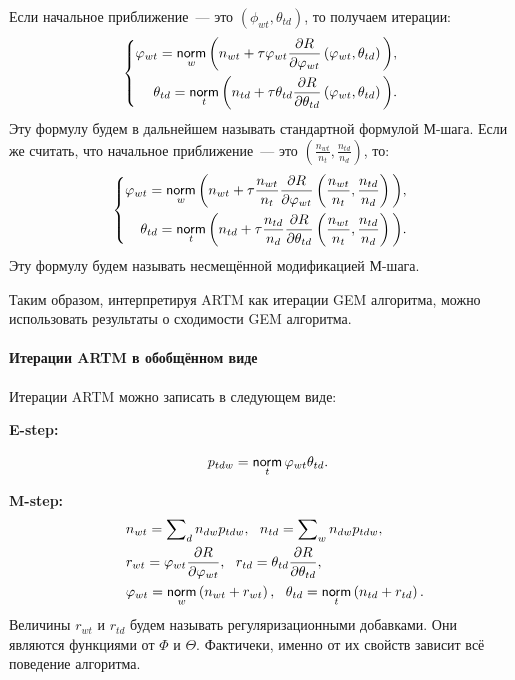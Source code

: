 \documentclass[12pt, twoside]{article}
\begin{document}
Если начальное приближение~--- это $(\phi_{wt}, \theta_{td})$, то получаем итерации:
\begin{equation}
\label{artm_original}
\left\{
	\begin{aligned}
		\phi_{wt} = \norm_w \bigg( n_{wt} + \tau\phi_{wt} \frac{\partial{R}}{\partial{\phi_{wt}}} \left( \phi_{wt}, \theta_{td}\right) \bigg),\\
		\theta_{td} = \norm_t \bigg( n_{td} + \tau\theta_{td} \frac{\partial{R}}{\partial{\theta_{td}}} \left( \phi_{wt}, \theta_{td}\right) \bigg).
	\end{aligned}
\right.
\end{equation}
Эту формулу будем в дальнейшем называть стандартной формулой М-шага. Если же считать, что начальное приближение~---  это $\left(\frac{n_{wt}}{n_t}, \frac{n_{td}}{n_d}\right)$, то:
\begin{equation}
\label{artm_unbiased}
\left\{
	\begin{aligned}
		\phi_{wt}= \norm_w \bigg( n_{wt} + \tau \frac{n_{wt}}{n_t} \frac{\partial{R}}{\partial{\phi_{wt}}} \left(\frac{n_{wt}}{n_t}, \frac{n_{td}}{n_d}\right) \bigg),\\
		\theta_{td} = \norm_t \bigg(n_{td} + \tau \frac{n_{td}}{n_d} \frac{\partial{R}}{\partial{\theta_{td}}} \left(\frac{n_{wt}}{n_t}, \frac{n_{td}}{n_d}\right) \bigg).
	\end{aligned}
\right.
\end{equation}
Эту формулу будем называть несмещённой модификацией М-шага.

Таким образом, интерпретируя ARTM как итерации GEM алгоритма, можно использовать результаты о сходимости GEM алгоритма.

\paragraph{Итерации ARTM в обобщённом виде}
Итерации ARTM можно записать в следующем виде: 

\textbf{E-step:}   
 
\begin{equation}
\label{artm_generalE}
\begin{aligned}
\qquad& p_{tdw} = \norm_t \phi_{wt} \theta_{td}.
\end{aligned}
\end{equation}

\textbf{M-step:}
\begin{equation}
\label{artm_generalM}
\begin{aligned}
\qquad& n_{wt} = \sum\nolimits_{d} n_{dw} p_{tdw},~~n_{td} = \sum\nolimits_{w} n_{dw} p_{tdw},\\    
\qquad& r_{wt} =  \phi_{wt}\frac{\partial R}{\partial\phi_{wt}},~~ r_{td} =  \theta_{td}\frac{\partial R}{\partial\theta_{td}},\\
\qquad& \phi_{wt}  = \norm_w \left(n_{wt} + r_{wt} \right),~~\theta_{td} = \norm_t  \left(n_{td} + r_{td}\right).\\
\end{aligned}
\end{equation}
Величины $r_{wt}$ и $r_{td}$ будем называть регуляризационными добавками. Они являются функциями от $\Phi$ и $\Theta$. Фактичеки, именно от их свойств зависит всё поведение алгоритма.
\end{document}
